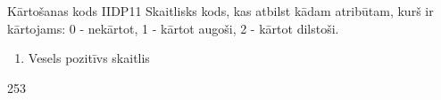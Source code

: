 {Kārtošanas kods}
{IIDP11}
{
	Skaitlisks kods, kas atbilst kādam atribūtam, kurš ir kārtojams: 0 - nekārtot, 1 - kārtot augoši, 2 - kārtot dilstoši.
}
{
	\begin{enumerate}
		\item Vesels pozitīvs skaitlis
	\end{enumerate}
}
{
	253
}

